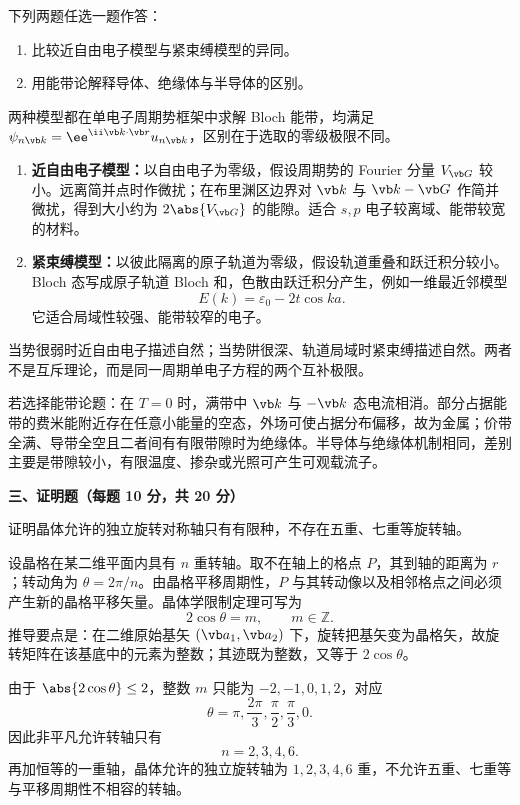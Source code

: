 \begin{question}[10 分]
下列两题任选一题作答：
\begin{enumerate}
  \item 比较近自由电子模型与紧束缚模型的异同。
  \item 用能带论解释导体、绝缘体与半导体的区别。
\end{enumerate}


\begin{solution}
两种模型都在单电子周期势框架中求解 Bloch 能带，均满足
$\psi_{n\vb k}=\ee^{\ii\vb k\cdot\vb r}u_{n\vb k}$，区别在于选取的零级极限不同。
\begin{enumerate}
  \item \textbf{近自由电子模型：}以自由电子为零级，假设周期势的 Fourier 分量 $V_{\vb G}$ 较小。远离简并点时作微扰；在布里渊区边界对 $\vb k$ 与 $\vb k-\vb G$ 作简并微扰，得到大小约为 $2\abs{V_{\vb G}}$ 的能隙。适合 $s,p$ 电子较离域、能带较宽的材料。
  \item \textbf{紧束缚模型：}以彼此隔离的原子轨道为零级，假设轨道重叠和跃迁积分较小。Bloch 态写成原子轨道 Bloch 和，色散由跃迁积分产生，例如一维最近邻模型
  \[
    E(k)=\varepsilon_0-2t\cos ka.
  \]
  它适合局域性较强、能带较窄的电子。
\end{enumerate}
当势很弱时近自由电子描述自然；当势阱很深、轨道局域时紧束缚描述自然。两者不是互斥理论，而是同一周期单电子方程的两个互补极限。


若选择能带论题：在 $T=0$ 时，满带中 $\vb k$ 与 $-\vb k$ 态电流相消。部分占据能带的费米能附近存在任意小能量的空态，外场可使占据分布偏移，故为金属；价带全满、导带全空且二者间有有限带隙时为绝缘体。半导体与绝缘体机制相同，差别主要是带隙较小，有限温度、掺杂或光照可产生可观载流子。
\end{solution}
\end{question}

\textbf{三、证明题（每题 10 分，共 20 分）}

\begin{question}[10 分]
证明晶体允许的独立旋转对称轴只有有限种，不存在五重、七重等旋转轴。


\begin{solution}
设晶格在某二维平面内具有 $n$ 重转轴。取不在轴上的格点 $P$，其到轴的距离为 $r$；转动角为 $\theta=2\pi/n$。由晶格平移周期性，$P$ 与其转动像以及相邻格点之间必须产生新的晶格平移矢量。晶体学限制定理可写为
\[
 2\cos\theta=m,\qquad m\in\mathbb Z.
\]
推导要点是：在二维原始基矢 $(\vb a_1,\vb a_2)$ 下，旋转把基矢变为晶格矢，故旋转矩阵在该基底中的元素为整数；其迹既为整数，又等于 $2\cos\theta$。

由于 $\abs{2\cos\theta}\le2$，整数 $m$ 只能为 $-2,-1,0,1,2$，对应
\[
 \theta=\pi,\frac{2\pi}{3},\frac{\pi}{2},\frac{\pi}{3},0.
\]
因此非平凡允许转轴只有
\[
 \boxed{n=2,3,4,6.}
\]
再加恒等的一重轴，晶体允许的独立旋转轴为 $1,2,3,4,6$ 重，不允许五重、七重等与平移周期性不相容的转轴。
\end{solution}
\end{question}

